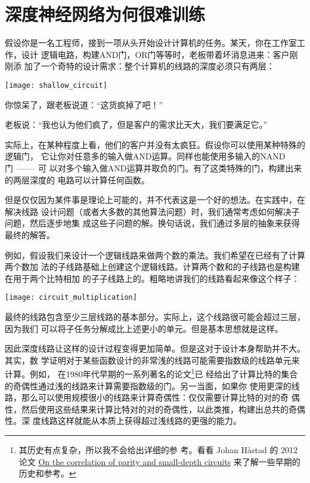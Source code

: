 
\chapter{深度神经网络为何很难训练}
\label{ch:WhyHardToTrain}

假设你是一名工程师，接到一项从头开始设计计算机的任务。某天，你在工作室工作，设计
逻辑电路，构建{\serif AND}门，{\serif OR}门等等时，老板带着坏消息进来：客户刚刚添
加了一个奇特的设计需求：整个计算机的线路的深度必须只有两层：
\begin{center}
  \texttt{[image: shallow\_circuit]}
\end{center}

你惊呆了，跟老板说道：“这货疯掉了吧！”
 
老板说：“我也认为他们疯了，但是客户的需求比天大，我们要满足它。”
 
实际上，在某种程度上看，他们的客户并没有太疯狂。假设你可以使用某种特殊的逻辑门，
它让你对任意多的输入做{\serif AND}运算。同样也能使用多输入的{\serif NAND}门~——~可
以对多个输入做{\serif AND}运算并取负的门。有了这类特殊的门，构建出来的两层深度的
电路可以计算任何函数。

但是仅仅因为某件事是理论上可能的，并不代表这是一个好的想法。在实践中，在解决线路
设计问题（或者大多数的其他算法问题）时，我们通常考虑如何解决子问题，然后逐步地集
成这些子问题的解。换句话说，我们通过多层的抽象来获得最终的解答。

例如，假设我们来设计一个逻辑线路来做两个数的乘法。我们希望在已经有了计算两个数加
法的子线路基础上创建这个逻辑线路。计算两个数和的子线路也是构建在用于两个比特相加
的子子线路上的。粗略地讲我们的线路看起来像这个样子：
\begin{center}
  \texttt{[image: circuit\_multiplication]}
\end{center}

最终的线路包含至少三层线路的基本部分。实际上，这个线路很可能会超过三层，因为我们
可以将子任务分解成比上述更小的单元。但是基本思想就是这样。
 
因此深度线路让这样的设计过程变得更加简单。但是这对于设计本身帮助并不大。其实，数
学证明对于某些函数设计的非常浅的线路可能需要指数级的线路单元来计算。例如，
在1980年代早期的一系列著名的论文\footnote{其历史有点复杂，所以我不会给出详细的参
  考。看看 Johan
  Håstad 的 2012 论文 \href{http://eccc.hpi-web.de/report/2012/137/}{On the
    correlation of parity and small-depth circuits} 来了解一些早期的历史和参考。}已
经给出了计算比特的集合的奇偶性通过浅的线路来计算需要指数级的门。另一当面，如果你
使用更深的线路，那么可以使用规模很小的线路来计算奇偶性：仅仅需要计算比特的对的奇
偶性，然后使用这些结果来计算比特对的对的奇偶性，以此类推，构建出总共的奇偶性。深
度线路这样就能从本质上获得超过浅线路的更强的能力。
 
